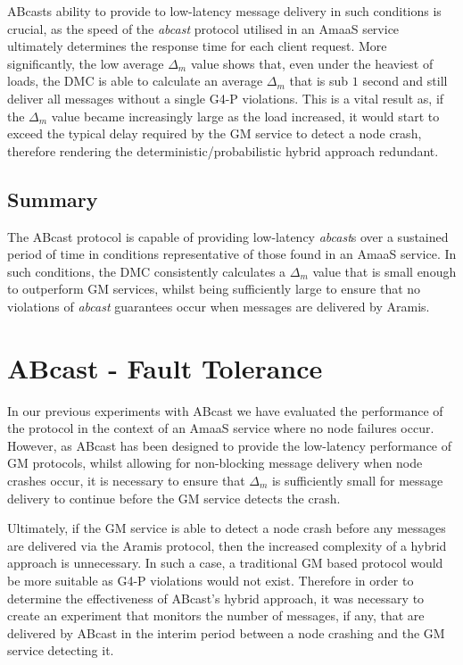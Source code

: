     \textsf{ABcast}s ability to provide to low-latency message delivery in such conditions is crucial, as the speed of the \emph{abcast} protocol utilised in an \textsf{AmaaS} service ultimately determines the response time for each client request.  More significantly, the low average $\Delta_m$ value shows that, even under the heaviest of loads, the DMC is able to calculate an average $\Delta_m$ that is sub $1$ second and still deliver all messages without a single G4-P violations.  This is a vital result as, if the $\Delta_m$ value became increasingly large as the load increased, it would start to exceed the typical delay required by the GM service to detect a node crash, therefore rendering the deterministic/probabilistic hybrid approach redundant.  
    
    \subsection{Summary}
    The \textsf{ABcast} protocol is capable of providing low-latency \emph{abcast}s over a sustained period of time in conditions representative of those found in an \textsf{AmaaS} service.  In such conditions, the DMC consistently calculates a $\Delta_m$ value that is small enough to outperform GM services, whilst being sufficiently large to ensure that no violations of \emph{abcast} guarantees occur when messages are delivered by \textsf{Aramis}.  
    
\section{ABcast - Fault Tolerance}\label{sec:infini_crashed_node}
    In our previous experiments with \textsf{ABcast} we have evaluated the performance of the protocol in the context of an \textsf{AmaaS} service where no node failures occur.  However, as \textsf{ABcast} has been designed to provide the low-latency performance of GM protocols, whilst allowing for non-blocking message delivery when node crashes occur, it is necessary to ensure that $\Delta_m$ is sufficiently small for message delivery to continue before the GM service detects the crash.  
    
    Ultimately, if the GM service is able to detect a node crash before any messages are delivered via the \textsf{Aramis} protocol, then the increased complexity of a hybrid approach is unnecessary.  In such a case, a traditional GM based protocol would be more suitable as G4-P violations would not exist.  Therefore in order to determine the effectiveness of \textsf{ABcast}'s hybrid approach, it was necessary to create an experiment that monitors the number of messages, if any, that are delivered by \textsf{ABcast} in the interim period between a node crashing and the GM service detecting it.  
    
